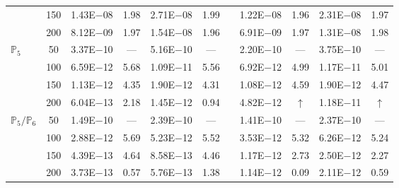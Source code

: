 \begin{table}[H]
{\begin{tabular}{@{}l c c c c c c c c c c@{}}
 & 150 & 1.43E$-$08 & 1.98  & 2.71E$-$08 & 1.99 &  & 1.22E$-$08 & 1.96 & 2.31E$-$08 & 1.97\\
 & 200 & 8.12E$-$09 & 1.97  & 1.54E$-$08 & 1.96 &  & 6.91E$-$09 & 1.97 & 1.31E$-$08 & 1.98\\
\midrule
\multirow{4}{*}{$\mathbb{P}_{5}$}
 & 50 & 3.37E$-$10 & ---  & 5.16E$-$10 & --- &  & 2.20E$-$10 & --- & 3.75E$-$10 & ---\\
 & 100 & 6.59E$-$12 & 5.68  & 1.09E$-$11 & 5.56 &  & 6.92E$-$12 & 4.99 & 1.17E$-$11 & 5.01\\
 & 150 & 1.13E$-$12 & 4.35  & 1.90E$-$12 & 4.31 &  & 1.08E$-$12 & 4.59 & 1.90E$-$12 & 4.47\\
 & 200 & 6.04E$-$13 & 2.18  & 1.45E$-$12 & 0.94 &  & 4.82E$-$12 & $\uparrow$ & 1.18E$-$11 & $\uparrow$\\
\midrule
\multirow{4}{*}{$\mathbb{P}_{5}/\mathbb{P}_{6}$}
 & 50 & 1.49E$-$10 & ---  & 2.39E$-$10 & --- &  & 1.41E$-$10 & --- & 2.37E$-$10 & ---\\
 & 100 & 2.88E$-$12 & 5.69  & 5.23E$-$12 & 5.52 &  & 3.53E$-$12 & 5.32 & 6.26E$-$12 & 5.24\\
 & 150 & 4.39E$-$13 & 4.64  & 8.58E$-$13 & 4.46 &  & 1.17E$-$12 & 2.73 & 2.50E$-$12 & 2.27\\
 & 200 & 3.73E$-$13 & 0.57  & 5.76E$-$13 & 1.38 &  & 1.14E$-$12 & 0.09 & 2.11E$-$12 & 0.59\\
\bottomrule
\end{tabular}}
\label{none}
\end{table}
